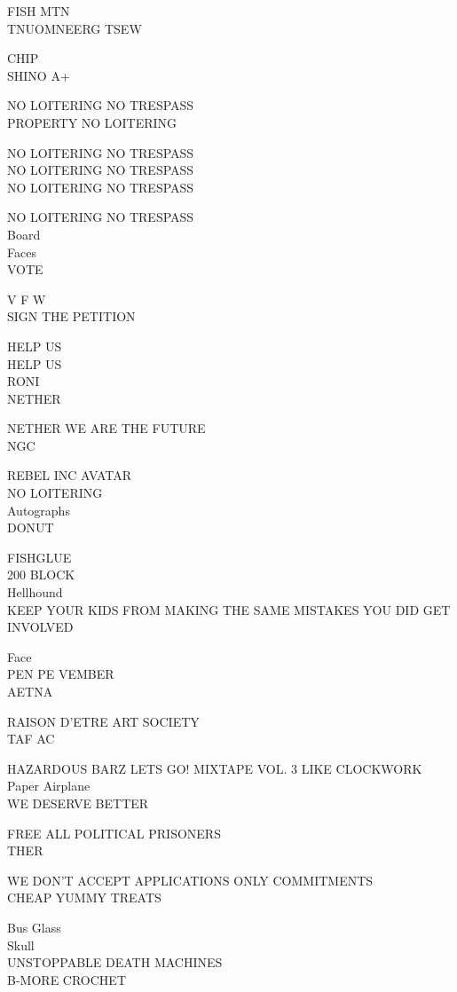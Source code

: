 \documentclass[10pt,letterpaper]{article}
\begin{document}
FISH MTN\\
TNUOMNEERG TSEW

CHIP\\
SHINO A+

NO LOITERING NO TRESPASS\\
PROPERTY NO LOITERING

NO LOITERING NO TRESPASS\\
NO LOITERING NO TRESPASS\\
NO LOITERING NO TRESPASS

NO LOITERING NO TRESPASS\\
Board\\
Faces\\
VOTE

V F W\\
SIGN THE PETITION

HELP US\\
HELP US\\
RONI\\
NETHER

NETHER WE ARE THE FUTURE\\
NGC

REBEL INC AVATAR\\
NO LOITERING\\
Autographs\\
DONUT

FISHGLUE\\
200 BLOCK\\
Hellhound\\
KEEP YOUR KIDS FROM MAKING THE SAME MISTAKES YOU DID GET INVOLVED

Face\\
PEN PE VEMBER\\
AETNA

RAISON D'ETRE ART SOCIETY\\
TAF AC

HAZARDOUS BARZ LETS GO! MIXTAPE VOL. 3 LIKE CLOCKWORK\\
Paper Airplane\\
WE DESERVE BETTER

FREE ALL POLITICAL PRISONERS\\
THER

WE DON'T ACCEPT APPLICATIONS ONLY COMMITMENTS\\
CHEAP YUMMY TREATS

Bus Glass\\
Skull\\
UNSTOPPABLE DEATH MACHINES\\
B{-}MORE CROCHET
\end{document}
